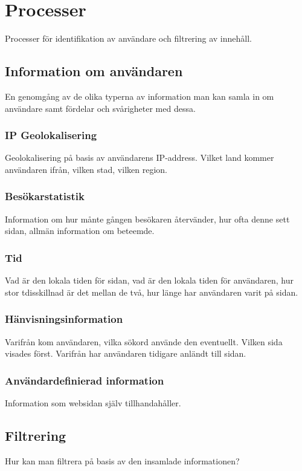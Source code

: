 \section{Processer}

Processer för identifikation av användare och filtrering av innehåll.

\subsection{Information om användaren}

En genomgång av de olika typerna av information man kan samla in om användare samt fördelar och svårigheter med dessa.

\subsubsection{IP Geolokalisering}

Geolokalisering på basis av användarens IP-address. Vilket land kommer användaren ifrån, vilken stad, vilken region.

\subsubsection{Besökarstatistik}

Information om hur månte gången besökaren återvänder, hur ofta denne sett sidan, allmän information om beteemde.

\subsubsection{Tid}

Vad är den lokala tiden för sidan, vad är den lokala tiden för användaren, hur stor tdisskillnad är det mellan de två, hur länge har användaren varit på sidan.

\subsubsection{Hänvisningsinformation}

Varifrån kom användaren, vilka sökord använde den eventuellt. Vilken sida visades först. Varifrån har användaren tidigare anländt till sidan.

\subsubsection{Användardefinierad information}

Information som websidan själv tillhandahåller.

\subsection{Filtrering}

Hur kan man filtrera på basis av den insamlade informationen?


